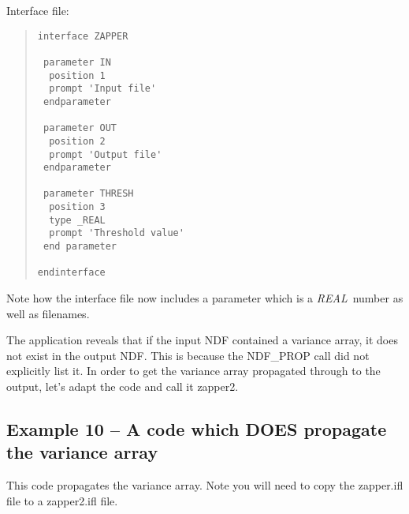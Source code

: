 Interface file:

\begin{quote}
{\small
\begin{verbatim}
interface ZAPPER

 parameter IN
  position 1
  prompt 'Input file'
 endparameter

 parameter OUT
  position 2
  prompt 'Output file'
 endparameter

 parameter THRESH
  position 3
  type _REAL
  prompt 'Threshold value'
 end parameter

endinterface
\end{verbatim}
}
\end{quote}

Note how the interface file now includes a parameter which is a {\em REAL}\,
number as well as filenames.

The  application
reveals that if the input NDF contained a variance array, it does not
exist in the output NDF. This is because the
{\sf NDF\_PROP} call did
not explicitly list it. In order to get the variance array propagated
through to the output, let's adapt the code and call it {\sf zapper2}.

\subsection{Example 10 -- A code which DOES propagate the variance array}

This code propagates the variance array. Note you will need to copy the
{\sf zapper.ifl} file to a {\sf zapper2.ifl} file.

